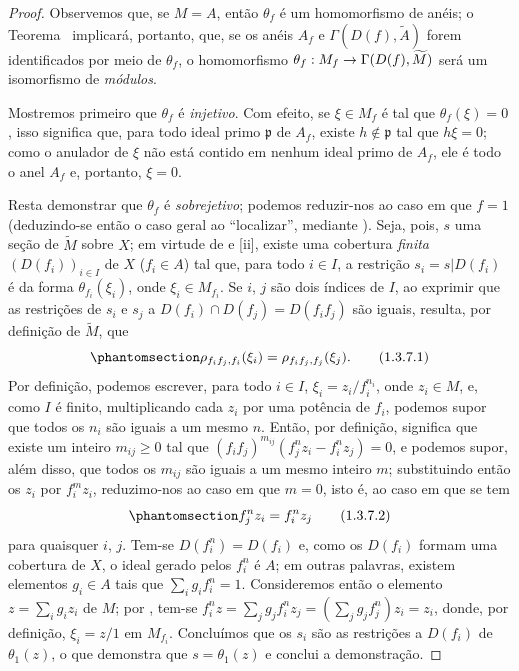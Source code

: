 \documentclass[oneside]{amsart}
\makeatletter
\renewcommand{\geq}{\geqslant}
\newcommand{\ega@arrow}[2]{\mathchoice{#1}{#2}{#2}{#2}}
\renewcommand{\to}{\ega@arrow{\longrightarrow}{\rightarrow}}
\newcommand{\oldpage}[2][]{{\marginnote{\normalfont\textbf{#1}~|~#2}}\ignorespaces}
\let\EGAOriginalLabel\label
\renewcommand{\label}[1]{\phantomsection\EGAOriginalLabel{#1}}
\makeatother
\begin{document}
\begin{proof}
Observemos que, se $M=A$, então $\theta_f$ é um homomorfismo de anéis;
o Teorema~ implicará, portanto, que, se os anéis $A_f$ e $\Gamma(D(f),\widetilde{A})$ forem identificados por meio de $\theta_f$, o homomorfismo $\theta_f:M_f\to\Gamma(D(f),\widetilde{M})$ será um isomorfismo de \emph{módulos}.

Mostremos primeiro que $\theta_f$ é \emph{injetivo}.
Com efeito, se $\xi\in M_f$ é tal que $\theta_f(\xi)=0$, isso significa que, para todo ideal primo $\mathfrak{p}$ de $A_f$, existe $h\not\in\mathfrak{p}$ tal que $h\xi=0$;
como o anulador de $\xi$ não está contido em nenhum ideal primo de $A_f$, ele é todo o anel $A_f$ e, portanto, $\xi=0$.

Resta demonstrar que $\theta_f$ é \emph{sobrejetivo};
podemos reduzir-nos ao caso em que $f=1$ (deduzindo-se então o caso geral ao ``localizar'', mediante ).
Seja, pois, $s$ uma seção de $\widetilde{M}$ sobre $X$;
em virtude de  e [ii], existe uma cobertura \emph{finita} $(D(f_i))_{i\in I}$ de $X$ ($f_i\in A$) tal que, para todo $i\in I$, a restrição $s_i=s|D(f_i)$ é da forma $\theta_{f_i}(\xi_i)$, onde $\xi_i\in M_{f_i}$.
Se $i$, $j$ são dois índices de $I$, ao exprimir que as restrições de $s_i$ e $s_j$ a $D(f_i)\cap D(f_j)=D(f_i f_j)$ são iguais, resulta, por definição de $\widetilde{M}$, que
\[
  \label{I.1.3.7.1}
  \rho_{f_i f_j,f_i}(\xi_i)=\rho_{f_i f_j,f_j}(\xi_j).
  \tag{1.3.7.1}
\]
Por definição, podemos escrever, para todo $i\in I$, $\xi_i=z_i/f_i^{n_i}$, onde $z_i\in M$, e, como $I$ é finito, multiplicando cada $z_i$ por uma potência de $f_i$, podemos supor que todos os $n_i$ são iguais a um mesmo $n$.
Então, por definição,  significa que existe um inteiro $m_{ij}\geq 0$ tal que $(f_i f_j)^{m_{ij}}(f_j^n z_i-f_i^n z_j)=0$, e podemos supor, além disso, que todos os $m_{ij}$ são iguais a um mesmo inteiro $m$;
substituindo então os $z_i$ por $f_i^m z_i$, reduzimo-nos ao caso em que $m=0$, isto é, ao caso em que se tem
\[
  \label{I.1.3.7.2}
  f_j^n z_i=f_i^n z_j
  \tag{1.3.7.2}
\]
para quaisquer $i$, $j$.
Tem-se $D(f_i^n)=D(f_i)$ e, como os $D(f_i)$ formam uma cobertura de $X$, o ideal gerado pelos $f_i^n$ é $A$;
em outras palavras, existem elementos $g_i\in A$ tais que $\sum_i g_i f_i^n=1$.
Consideremos então o elemento $z=\sum_i g_i z_i$ de $M$;
por , tem-se $f_i^n z=\sum_j g_j f_i^n z_j=(\sum_j g_j f_j^n)z_i=z_i$, donde, por definição, $\xi_i=z/1$ em $M_{f_i}$.
Concluímos
\oldpage[I]{87}
que os $s_i$ são as restrições a $D(f_i)$ de $\theta_1(z)$, o que demonstra que $s=\theta_1(z)$ e conclui a demonstração.
\end{proof}
\end{document}
